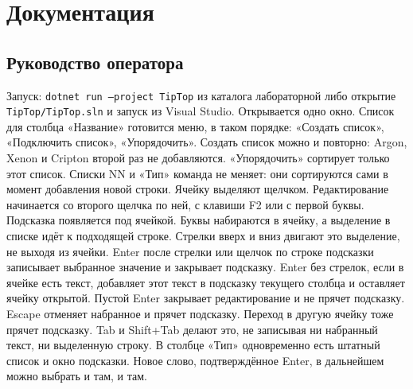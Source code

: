 \documentclass[a4paper,14pt]{extarticle}
\begin{document}
\section{Документация}
\subsection{Руководство оператора}
Запуск: \texttt{dotnet run --project TipTop} из каталога лабораторной либо открытие \texttt{TipTop/TipTop.sln} и запуск из Visual Studio. Открывается одно окно.
Список для столбца «Название» готовится меню, в таком порядке: «Создать список», «Подключить список», «Упорядочить». Создать список можно и повторно: Argon, Xenon и Cripton второй раз не добавляются. «Упорядочить» сортирует только этот список. Списки NN и «Тип» команда не меняет: они сортируются сами в момент добавления новой строки.
Ячейку выделяют щелчком. Редактирование начинается со второго щелчка по ней, с клавиши F2 или с первой буквы. Подсказка появляется под ячейкой. Буквы набираются в ячейку, а выделение в списке идёт к подходящей строке. Стрелки вверх и вниз двигают это выделение, не выходя из ячейки. Enter после стрелки или щелчок по строке подсказки записывает выбранное значение и закрывает подсказку.
Enter без стрелок, если в ячейке есть текст, добавляет этот текст в подсказку текущего столбца и оставляет ячейку открытой. Пустой Enter закрывает редактирование и не прячет подсказку. Escape отменяет набранное и прячет подсказку. Переход в другую ячейку тоже прячет подсказку. Tab и Shift+Tab делают это, не записывая ни набранный текст, ни выделенную строку.
В столбце «Тип» одновременно есть штатный список и окно подсказки. Новое слово, подтверждённое Enter, в дальнейшем можно выбрать и там, и там.
\end{document}

